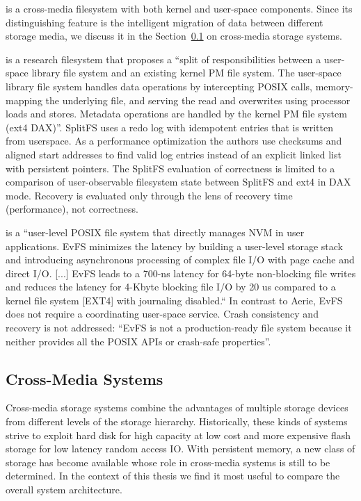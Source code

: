 \documentclass[12pt,a4paper,twoside]{book}
\begin{document}
 is a cross-media filesystem with both kernel and user-space components.
Since its distinguishing feature is the intelligent migration of data between different storage media, we discuss it in the Section~\ref{sec:cross_media_storage_systems} on cross-media storage systems.

 is a research filesystem that proposes a
“split of responsibilities between a user-space library file system and an existing kernel PM file system.
The user-space library file system handles data operations by intercepting POSIX calls, memory-mapping the underlying file, and serving the read and overwrites using processor loads and stores.
Metadata operations are handled by the kernel PM file system (ext4 DAX)”.
SplitFS uses a redo log with idempotent entries that is written from userspace.
As a performance optimization the authors use checksums and aligned start addresses to find valid log entries instead of an explicit linked list with persistent pointers.
The SplitFS evaluation of correctness is limited to a comparison of user-observable filesystem state between SplitFS and ext4 in DAX mode.
Recovery is evaluated only through the lens of recovery time (performance), not correctness.

 is a
“user-level POSIX file system that directly manages NVM in user applications.
EvFS minimizes the latency by building a user-level storage stack and introducing asynchronous processing of complex file I/O with page cache and direct I/O.
[...]
EvFS leads to a 700-ns latency for 64-byte non-blocking file writes and reduces the latency for 4-Kbyte blocking file I/O by 20 us compared to a kernel file system [EXT4] with journaling disabled.“
In contrast to Aerie, EvFS does not require a coordinating user-space service.
Crash consistency and recovery is not addressed:
“EvFS is not a production-ready file system because it neither provides all the POSIX APIs or crash-safe properties”.

\subsection{Cross-Media Systems}\label{sec:cross_media_storage_systems}
Cross-media storage systems combine the advantages of multiple storage devices from different levels of the storage hierarchy.
Historically, these kinds of systems strive to exploit hard disk for high capacity at low cost and more expensive flash storage for low latency random access IO.
With persistent memory, a new class of storage has become available whose role in cross-media systems is still to be determined.
In the context of this thesis we find it most useful to compare the overall system architecture.
\end{document}
